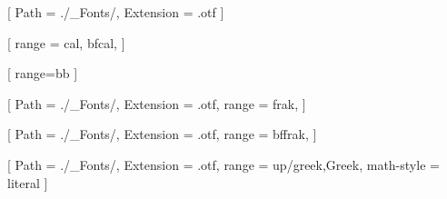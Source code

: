 

\usepackage{mathtools}                            %
\usepackage{amsthm}                               %
\usepackage{mathrsfs}
\usepackage{xfrac}                                %
\usepackage{accents}
\usepackage{unicode-math}                        %
\usepackage{stackrel}                             %






    [             %
                 Path            = ./_Fonts/,
                 Extension       = .otf
                 ]
    
    [                  %
                 range           = {cal, bfcal},
                 ]
    
    [               %
                 range=bb
                 ]
    
    [               %
                 Path            = ./_Fonts/,
                 Extension       = .otf,
                 range           = frak,
                 ]
    
    [               %
                 Path            = ./_Fonts/,
                 Extension       = .otf,
                 range           = bffrak,
                 ]
    
    
    [             %
                 Path            = ./_Fonts/,
                 Extension       = .otf,
                 range           = up/{greek,Greek},          
                 math-style      = literal
                 ]
    

